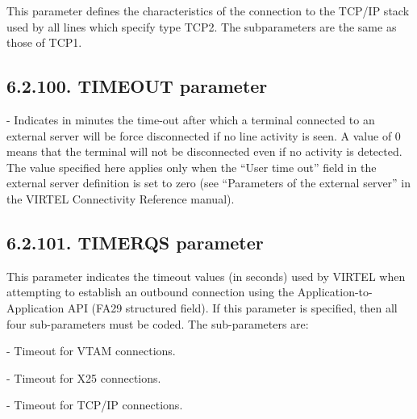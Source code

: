 \documentclass[letterpaper,10pt,english]{sphinxmanual}
\begin{document}
This parameter defines the characteristics of the connection to the TCP/IP stack used by all lines which specify type TCP2. The subparameters are the same as those of TCP1.


\subsection{6.2.100. TIMEOUT parameter}
\label{\detokenize{Installation_Guide:timeout-parameter}}
\begin{sphinxVerbatim}[commandchars=\\\{\}]
 
\end{sphinxVerbatim}

 - Indicates in minutes the time-out after which a terminal connected to an external server will be force disconnected if no line activity is seen. A value of 0 means that the terminal will not be disconnected even if no activity is detected. The value specified here applies only when the “User time out” field in the external server definition is set to zero (see “Parameters of the external server” in the VIRTEL Connectivity Reference manual).


\subsection{6.2.101. TIMERQS parameter}
\label{\detokenize{Installation_Guide:timerqs-parameter}}
\begin{sphinxVerbatim}[commandchars=\\\{\}]
 
\end{sphinxVerbatim}

This parameter indicates the timeout values (in seconds) used by VIRTEL when attempting to establish an outbound connection using the Application-to-Application API (FA29 structured field). If this parameter is specified, then all four sub-parameters must be coded. The sub-parameters are:

 - Timeout for VTAM connections.

 - Timeout for X25 connections.

 - Timeout for TCP/IP connections.
\end{document}
